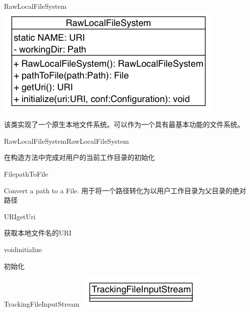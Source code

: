 \begin{XeClass}{RawLocalFileSystem}
\includegraphics[width=\textwidth]{cdig/RawLocalFileSystem.png}
     
 该类实现了一个原生本地文件系统。可以作为一个具有最基本功能的文件系统。

    \begin{XeMethod}{\XePublic}{RawLocalFileSystem}{RawLocalFileSystem}
         
 在构造方法中完成对用户的当前工作目录的初始化

    \end{XeMethod}

    \begin{XeMethod}{\XePublic}{File}{pathToFile}
         
 Convert a path to a File.
 用于将一个路径转化为以用户工作目录为父目录的绝对路径

    \end{XeMethod}

    \begin{XeMethod}{\XePublic}{URI}{getUri}
         
 获取本地文件名的URI

    \end{XeMethod}

    \begin{XeMethod}{\XePublic}{void}{initialize}
         
 初始化

    \end{XeMethod}

    \begin{XeInnerClass}{TrackingFileInputStream}
\includegraphics[width=\textwidth]{cdig/TrackingFileInputStream.png}
         

\end{XeInnerClass}
\end{XeClass}
